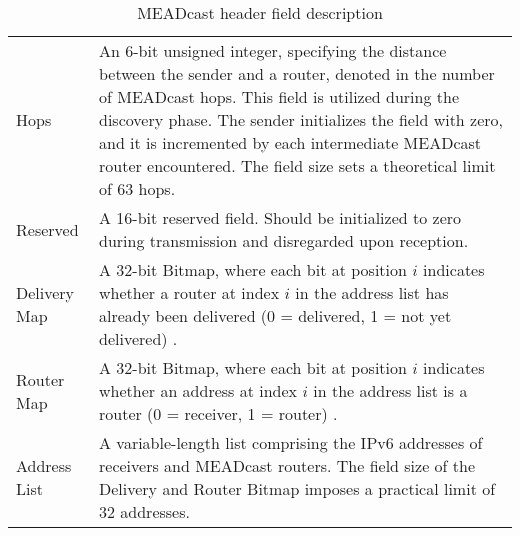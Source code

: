 \begin{table}[!htbp]
\begin{tabularx}{\textwidth}{lX}
Hops          & An 6-bit unsigned integer, specifying the distance between the
                sender and a router, denoted in the number of MEADcast hops.
                This field is utilized during the discovery phase. The sender
                initializes the field with zero, and it is incremented by each
                intermediate MEADcast router encountered.
                The field size sets a theoretical limit of 63 hops.\\
Reserved      & A 16-bit reserved field.
                Should be initialized to zero during transmission and
                disregarded upon reception.\\
Delivery Map  & A 32-bit Bitmap, where each bit at position $i$ indicates
                whether a router at index $i$ in the address list has already
                been delivered (0 = delivered, 1 = not yet delivered)
                \cite{meadcast2}. \\
Router Map    & A 32-bit Bitmap, where each bit at position $i$ indicates
                whether an address at index $i$ in the address list is a
                router (0 = receiver, 1 = router) \cite{meadcast2}.\\
Address List  & A variable-length list comprising the IPv6 addresses of
                receivers and MEADcast routers.
                The field size of the Delivery and Router Bitmap imposes a
                practical limit of 32 addresses.\\
\bottomrule
\end{tabularx}
\caption{MEADcast header field description}
\label{tab:meadcast_header}
\end{table}
\egroup


